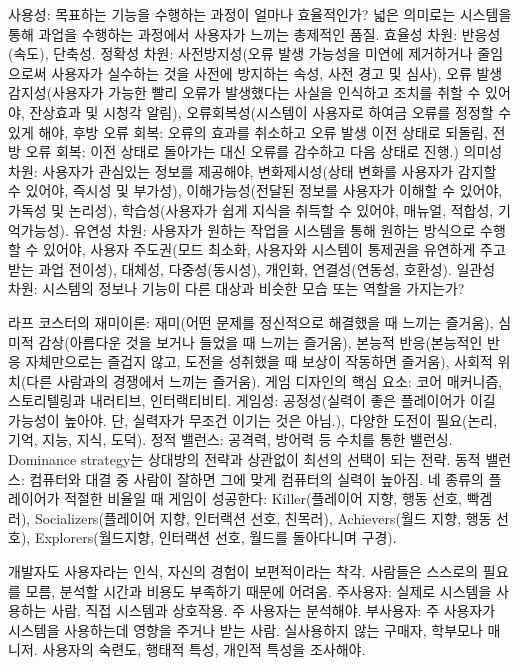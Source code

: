 \bitmz
  \itm 사용성: 목표하는 기능을 수행하는 과정이 얼마나 효율적인가? 넓은 의미로는 시스템을 통해 과업을 수행하는 과정에서 사용자가 느끼는 총제적인 품질.
  \itm 효율성 차원: 반응성(속도), 단축성.
  \itm 정확성 차원: 사전방지성(오류 발생 가능성을 미연에 제거하거나 줄임으로써 사용자가 실수하는 것을 사전에 방지하는 속성, 사전 경고 및 심사), 오류 발생 감지성(사용자가 가능한 빨리 오류가 발생했다는 사실을 인식하고 조치를 취할 수 있어야, 잔상효과 및 시청각 알림), 오류회복성(시스템이 사용자로 하여금 오류를 정정할 수 있게 해야, 후방 오류 회복: 오류의 효과를 취소하고 오류 발생 이전 상태로 되돌림, 전방 오류 회복: 이전 상태로 돌아가는 대신 오류를 감수하고 다음 상태로 진행.)
  \itm 의미성 차원: 사용자가 관심있는 정보를 제공해야, 변화제시성(상태 변화를 사용자가 감지할 수 있어야, 즉시성 및 부가성), 이해가능성(전달된 정보를 사용자가 이해할 수 있어야, 가독성 및 논리성), 학습성(사용자가 쉽게 지식을 취득할 수 있어야, 매뉴얼, 적합성, 기억가능성).
  \itm 유연성 차원: 사용자가 원하는 작업을 시스템을 통해 원하는 방식으로 수행할 수 있어야, 사용자 주도권(모드 최소화, 사용자와 시스템이 통제권을 유연하게 주고받는 과업 전이성), 대체성, 다중성(동시성), 개인화, 연결성(연동성, 호환성).
  \itm 일관성 차원: 시스템의 정보나 기능이 다른 대상과 비슷한 모습 또는 역할을 가지는가?
\eitmz


\bitmz
  \itm 라프 코스터의 재미이론: 재미(어떤 문제를 정신적으로 해결했을 때 느끼는 즐거움), 심미적 감상(아름다운 것을 보거나 들었을 때 느끼는 즐거움), 본능적 반응(본능적인 반응 자체만으로는 즐겁지 않고, 도전을 성취했을 때 보상이 작동하면 즐거움), 사회적 위치(다른 사람과의 경쟁에서 느끼는 즐거움).
  \itm 게임 디자인의 핵심 요소: 코어 매커니즘, 스토리텔링과 내러티브, 인터랙티비티.
  \itm 게임성: 공정성(실력이 좋은 플레이어가 이길 가능성이 높아야. 단, 실력자가 무조건 이기는 것은 아님.), 다양한 도전이 필요(논리, 기억, 지능, 지식, 도덕).
  \itm 정적 밸런스: 공격력, 방어력 등 수치를 통한 밸런싱. Dominance strategy는 상대방의 전략과 상관없이 최선의 선택이 되는 전략.
  \itm 동적 밸런스: 컴퓨터와 대결 중 사람이 잘하면 그에 맞게 컴퓨터의 실력이 높아짐.
  \itm 네 종류의 플레이어가 적절한 비율일 때 게임이 성공한다: Killer(플레이어 지향, 행동 선호, 빡겜러), Socializers(플레이어 지향, 인터랙션 선호, 친목러), Achievers(월드 지향, 행동 선호), Explorers(월드지향, 인터랙션 선호, 월드를 돌아다니며 구경).
\eitmz


\bitmz
  \itm 개발자도 사용자라는 인식, 자신의 경험이 보편적이라는 착각.
  \itm 사람들은 스스로의 필요를 모름, 분석할 시간과 비용도 부족하기 때문에 어려움.
  \itm 주사용자: 실제로 시스템을 사용하는 사람. 직접 시스템과 상호작용. 주 사용자는 분석해야.
  \itm 부사용자: 주 사용자가 시스템을 사용하는데 영향을 주거나 받는 사람. 실사용하지 않는 구매자, 학부모나 매니저.
  \itm 사용자의 숙련도, 행태적 특성, 개인적 특성을 조사해야.
\eitmz

